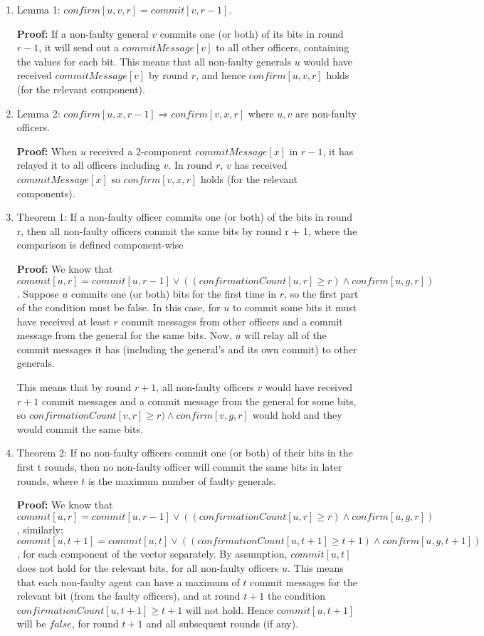 \documentclass[10pt,letter]{article}
\begin{document}
\begin{enumerate}
\item{Lemma 1: $confirm[u,v,r] = commit[v,r - 1]$.}

\textbf{Proof:} If a non-faulty general $v$ commits one (or both) of its bits in round $r - 1$, it will send out a $commitMessage[v]$ to all other officers, containing the values for each bit. This means that all non-faulty generals $u$ would have received $commitMessage[v]$ by round $r$, and hence $confirm[u,v,r]$ holds (for the relevant component).
\item{Lemma 2: $confirm[u,x,r-1] \Rightarrow confirm[v, x, r]$ where $u, v$ are non-faulty officers.}

\textbf{Proof:} When $u$ received a 2-component $commitMessage[x]$ in $r - 1$, it has relayed it to all officers including $v$. In round $r$, $v$ has received $commitMessage[x]$ so $confirm[v, x, r]$ holds (for the relevant components).
\item{Theorem 1: If a non-faulty officer commits one (or both) of the bits in round r, then all non-faulty officers commit the same bits by round r + 1, where the comparison is defined component-wise}

\textbf{Proof:} We know that $commit[u, r] = commit[u, r - 1] \lor ((confirmationCount[u, r] \geq r) \land confirm[u,g,r])$. Suppose $u$ commits one (or both) bits for the first time in $r$, so the first part of the condition must be false. In this case, for $u$ to commit some bits it must have received at least $r$ commit messages from other officers and a commit message from the general for the same bits. Now, $u$ will relay all of the commit messages it has (including the general's and its own commit) to other generals.

This means that by round $r+1$, all non-faulty officers $v$ would have received $r+1$ commit messages and a commit message from the general for some bits, so $confirmationCount[v, r] \geq r) \land confirm[v,g,r]$ would hold and they would commit the same bits.

\item{Theorem 2: If no non-faulty officers commit one (or both) of their bits in the first t rounds, then no non-faulty officer will commit the same bits in later rounds, where $t$ is the maximum number of faulty generals.}

\textbf{Proof:} We know that $commit[u, r] = commit[u, r - 1] \lor ((confirmationCount[u, r] \geq r) \land confirm[u,g,r])$, similarly: $commit[u, t+1] = commit[u, t] \lor ((confirmationCount[u, t+1] \geq t + 1) \land confirm[u,g,t+1])$, for each component of the vector separately. By assumption, $commit[u, t]$ does not hold for the relevant bits, for all non-faulty officers $u$. This means that each non-faulty agent can have a maximum of $t$ commit messages for the relevant bit (from the faulty officers), and at round $t+1$ the condition $confirmationCount[u, t+1] \geq t + 1$ will not hold. Hence $commit[u, t+1]$ will be $false$, for round $t+1$ and all subsequent rounds (if any).
\end{enumerate}
\end{document}
